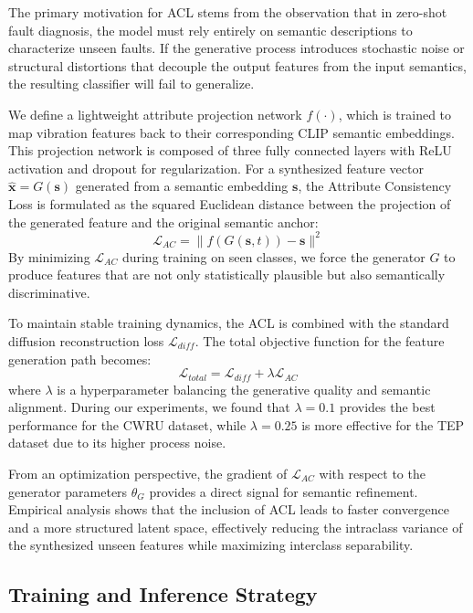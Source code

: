 \documentclass[journal]{IEEEtran}
\begin{document}
The primary motivation for ACL stems from the observation that in zero-shot fault diagnosis, the model must rely entirely on semantic descriptions to characterize unseen faults. If the generative process introduces stochastic noise or structural distortions that decouple the output features from the input semantics, the resulting classifier will fail to generalize.

We define a lightweight attribute projection network $f(\cdot)$, which is trained to map vibration features back to their corresponding CLIP semantic embeddings. This projection network is composed of three fully connected layers with ReLU activation and dropout for regularization. For a synthesized feature vector $\hat{\mathbf{x}} = G(\mathbf{s})$ generated from a semantic embedding $\mathbf{s}$, the Attribute Consistency Loss is formulated as the squared Euclidean distance between the projection of the generated feature and the original semantic anchor:
\begin{equation}
\mathcal{L}_{AC} = \| f(G(\mathbf{s}, t)) - \mathbf{s} \|^2
\end{equation}
By minimizing $\mathcal{L}_{AC}$ during training on seen classes, we force the generator $G$ to produce features that are not only statistically plausible but also semantically discriminative.

To maintain stable training dynamics, the ACL is combined with the standard diffusion reconstruction loss $\mathcal{L}_{diff}$. The total objective function for the feature generation path becomes:
\begin{equation}
\mathcal{L}_{total} = \mathcal{L}_{diff} + \lambda \mathcal{L}_{AC}
\end{equation}
where $\lambda$ is a hyperparameter balancing the generative quality and semantic alignment. During our experiments, we found that $\lambda=0.1$ provides the best performance for the CWRU dataset, while $\lambda=0.25$ is more effective for the TEP dataset due to its higher process noise.

From an optimization perspective, the gradient of $\mathcal{L}_{AC}$ with respect to the generator parameters $\theta_G$ provides a direct signal for semantic refinement. Empirical analysis shows that the inclusion of ACL leads to faster convergence and a more structured latent space, effectively reducing the intraclass variance of the synthesized unseen features while maximizing interclass separability.

\subsection{Training and Inference Strategy}
\end{document}
